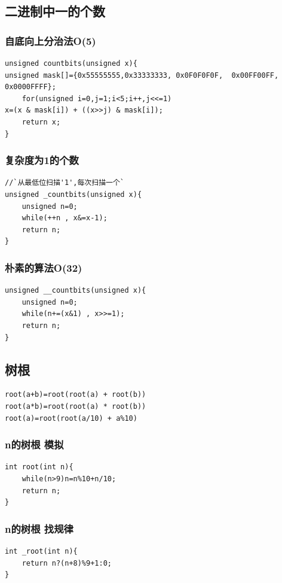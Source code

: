 \documentclass[a4paper]{article}
\begin{document}
\begin{CJK*}{UTF8}{gbsn}
\begin{multicols}{3}
\begin{flushleft}
\subsection{二进制中一的个数}

\subsubsection{自底向上分治法O(5)}
\begin{lstlisting}
unsigned countbits(unsigned x){
unsigned mask[]={0x55555555,0x33333333, 0x0F0F0F0F,  0x00FF00FF, 0x0000FFFF};
	for(unsigned i=0,j=1;i<5;i++,j<<=1)
x=(x & mask[i]) + ((x>>j) & mask[i]);
	return x;
} 
\end{lstlisting}


\subsubsection{复杂度为1的个数}
\begin{lstlisting}
//`从最低位扫描'1',每次扫描一个`
unsigned _countbits(unsigned x){
	unsigned n=0;
	while(++n , x&=x-1);
	return n;
} 
\end{lstlisting}


\subsubsection{朴素的算法O(32)}
\begin{lstlisting}
unsigned __countbits(unsigned x){
	unsigned n=0;
	while(n+=(x&1) , x>>=1);
	return n;
}
\end{lstlisting}

\subsection{树根}
\begin{lstlisting}
root(a+b)=root(root(a) + root(b)) 
root(a*b)=root(root(a) * root(b)) 
root(a)=root(root(a/10) + a%10)
\end{lstlisting}

\subsubsection{n的树根 模拟}
\begin{lstlisting}
int root(int n){
	while(n>9)n=n%10+n/10;
	return n;
}
\end{lstlisting}

\subsubsection{n的树根 找规律}
\begin{lstlisting}
int _root(int n){
	return n?(n+8)%9+1:0;
}
\end{lstlisting}


\end{flushleft}
\end{multicols}
\end{CJK*}
\end{document}
